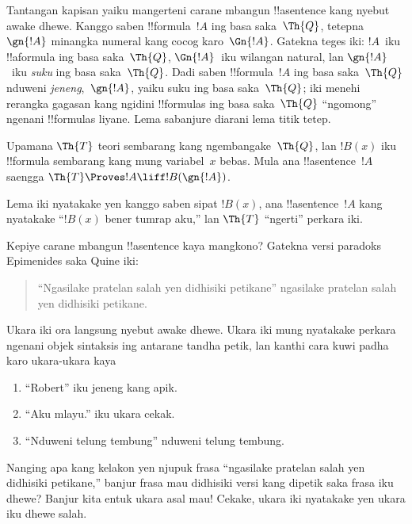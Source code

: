 \documentclass[../../../include/open-logic-section]{subfiles}
\begin{document}
Tantangan kapisan yaiku mangerteni carane mbangun !!a{sentence} kang
nyebut awake dhewe. Kanggo saben !!{formula}~$!A$ ing basa
saka~$\Th{Q}$, tetepna~$\gn{!A}$ minangka numeral kang cocog
karo~$\Gn{!A}$. Gatekna teges iki: $!A$~iku !!a{formula} ing
basa saka~$\Th{Q}$, $\Gn{!A}$~iku wilangan natural, lan $\gn{!A}$~iku
\emph{suku} ing basa saka~$\Th{Q}$. Dadi saben !!{formula}~$!A$
ing basa saka~$\Th{Q}$ nduweni \emph{jeneng},~$\gn{!A}$, yaiku
suku ing basa saka~$\Th{Q}$; iki menehi rerangka gagasan kang ngidini
!!{formula}s ing basa saka~$\Th{Q}$ ``ngomong'' ngenani
!!{formula}s liyane. Lema sabanjure diarani lema titik tetep.

\begin{lem}
Upamana $\Th{T}$ teori sembarang kang ngembangake~$\Th{Q}$, lan
$!B(x)$ iku !!{formula} sembarang kang mung variabel~$x$ bebas.
Mula ana !!a{sentence}~$!A$ saengga
$\Th{T} \Proves!A \liff !B(\gn{!A})$.
\end{lem}

Lema iki nyatakake yen kanggo saben sipat $!B(x)$, ana
!!a{sentence}~$!A$ kang nyatakake ``$!B(x)$ bener tumrap aku,''
lan $\Th{T}$ ``ngerti'' perkara iki.

Kepiye carane mbangun !!a{sentence} kaya mangkono? Gatekna versi
paradoks Epimenides saka Quine iki:
\begin{quote}
``Ngasilake pratelan salah yen didhisiki petikane'' ngasilake pratelan salah
yen didhisiki petikane.
\end{quote}
Ukara iki ora langsung nyebut awake dhewe. Ukara iki mung nyatakake
perkara ngenani objek sintaksis ing antarane tandha petik, lan kanthi
cara kuwi padha karo ukara-ukara kaya
\begin{enumerate}
\item ``Robert'' iku jeneng kang apik.
\item ``Aku mlayu.'' iku ukara cekak.
\item ``Nduweni telung tembung'' nduweni telung tembung.
\end{enumerate}
Nanging apa kang kelakon yen njupuk frasa ``ngasilake pratelan salah yen
didhisiki petikane,'' banjur frasa mau didhisiki versi kang dipetik
saka frasa iku dhewe? Banjur kita entuk ukara asal mau!{} Cekake,
ukara iki nyatakake yen ukara iku dhewe salah.
\end{document}
